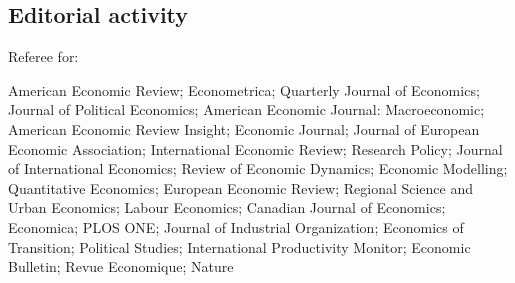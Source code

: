 \documentclass[12pt]{article}
\begin{document}
\subsection*{Editorial activity}

Referee for:  \\

\begin{footnotesize}
 American Economic Review; Econometrica; Quarterly Journal of Economics; Journal of Political Economics; American Economic Journal: Macroeconomic; American Economic Review Insight; Economic Journal; Journal of European Economic Association; International Economic Review; Research Policy; Journal of International Economics; Review of Economic Dynamics; Economic Modelling; Quantitative Economics; European Economic Review; Regional Science and Urban Economics; Labour Economics; Canadian Journal of Economics; Economica; PLOS ONE; Journal of Industrial Organization; Economics of Transition; Political Studies;  International Productivity Monitor; Economic Bulletin; Revue Economique; Nature
\end{footnotesize}
\end{document}
